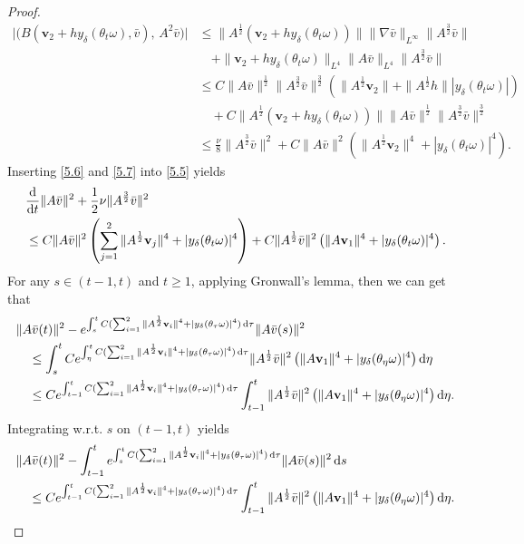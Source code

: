\documentclass{elsarticle}
\theoremstyle{definition}
\numberwithin{equation}{section}
\renewcommand{\d}{{\rm{d}}}
\begin{document}
\begin{proof}
\begin{align}
\big| \big(B(\textbf{v}_2+hy_\delta(\theta_t\omega),\bar{v}),\, A^2\bar{v}\big)\big|
&\leq \|A^\frac12(\textbf{v}_2+hy_\delta(\theta_t\omega))\|\|\nabla\bar{v}\|_{L^\infty}\|A^\frac32\bar{v}\| \nonumber\\
&\quad
 +\|\textbf{v}_2+hy_\delta(\theta_t\omega)\|_{L^4}\|A\bar{v}\|_{L^4}\|A^\frac32\bar{v}\|\nonumber\\
&\leq C\|A\bar{v}\|^\frac12\|A^\frac32\bar{v}\|^\frac32
\left (\|A^\frac12\textbf{v}_2\|+\|A^\frac12h\||y_\delta(\theta_t\omega)| \right)\nonumber\\
&\quad +C \|A^\frac12(\textbf{v}_2+hy_\delta(\theta_t\omega)
)\|\|A\bar{v}\|^\frac12\|A^\frac32\bar{v}\|^\frac32 \nonumber\\
&\leq \frac  \nu 8\|A^\frac32\bar{v}\|^2+C\|A\bar{v}\|^2 \left (\|A^\frac12\textbf{v}_2\|^4+|y_\delta(\theta_t\omega)|^4 \right).
\end{align}
Inserting \eqref{5.6} and \eqref{5.7} into \eqref{5.5} yields
\begin{align}\label{7.1}
&\frac{\d}{\d t}\|A\bar{v}\|^2+\frac12\nu\|A^{\frac32} \bar{v}\|^2\nonumber\\
&\leq C\|A\bar{v}\|^2 \left ( \sum_{j=1}^2 \|A^\frac12\textbf{v}_j\|^4 +|y_\delta(\theta_t\omega)|^4 \right )   +C\|A^\frac12\bar{v}\|^2 \left (\|A\textbf{v}_1\|^4+|y_\delta(\theta_t\omega)|^4 \right).
\end{align}
For any $s\in(t-1,t)$ and $t\geq 1$, applying Gronwall's lemma, then  we can get that
\begin{align*}
&\|A\bar{v}(t)\|^2
-e^{\int_s^tC( \sum_{i=1}^2 \|A^\frac12\textbf{v}_i\|^4 +|y_\delta(\theta_\tau\omega)|^4)\, \d \tau}\|A\bar{v}(s)\|^2\nonumber\\
&\quad \leq \int_s^tCe^{\int_\eta^tC( \sum_{i=1}^2 \|A^\frac12\textbf{v}_i\|^4+|y_\delta(\theta_\tau\omega)|^4)\, \d \tau}
\|A^\frac12\bar{v}\|^2 \left(\|A\textbf{v}_1\|^4+|y_\delta(\theta_\eta\omega)|^4\right) \d \eta\nonumber\\
&\quad \leq Ce^{\int_{t-1}^tC( \sum_{i=1}^2 \|A^\frac12\textbf{v}_i\|^4+|y_\delta(\theta_\tau\omega)|^4)\, \d \tau}
\int_{t-1}^t\|A^\frac12\bar{v}\|^2\left(\|A\textbf{v}_1\|^4+|y_\delta(\theta_\eta\omega)|^4 \right) \d \eta. \nonumber
\end{align*}
Integrating w.r.t. $s$ on $(t-1,t)$ yields
\begin{align}\label{5.9}
&\|A\bar{v}(t)\|^2
-\int_{t-1}^te^{\int_s^tC( \sum_{i=1}^2 \|A^\frac12\textbf{v}_i\|^4+|y_\delta(\theta_\tau\omega)|^4)\, \d \tau}\|A\bar{v}(s)\|^2\, \d s\nonumber\\
&\quad \leq Ce^{\int_{t-1}^tC( \sum_{i=1}^2 \|A^\frac12\textbf{v}_i\|^4+|y_\delta(\theta_\tau\omega)|^4)\, \d \tau}
\int_{t-1}^t\|A^\frac12\bar{v}\|^2\left (\|A\textbf{v}_1\|^4+|y_\delta(\theta_\eta\omega)|^4\right) \d \eta.
\end{align}


\end{proof}
\end{document}
